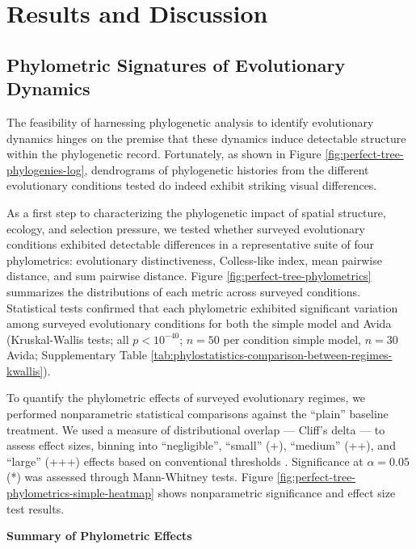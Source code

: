 \section{Results and Discussion}
\label{sec:results}

\subsection{Phylometric Signatures of Evolutionary Dynamics}




The feasibility of harnessing phylogenetic analysis to identify evolutionary dynamics hinges on the premise that these dynamics induce detectable structure within the phylogenetic record.
Fortunately, as shown in Figure \ref{fig:perfect-tree-phylogenies-log}, dendrograms of phylogenetic histories from the different evolutionary conditions tested do indeed exhibit striking visual differences.

As a first step to characterizing the phylogenetic impact of spatial structure, ecology, and selection pressure, we tested whether surveyed evolutionary conditions exhibited detectable differences in a representative suite of four phylometrics: evolutionary distinctiveness, Colless-like index, mean pairwise distance, and sum pairwise distance.
Figure \ref{fig:perfect-tree-phylometrics} summarizes the distributions of each metric across surveyed conditions.
Statistical tests confirmed that each phylometric exhibited significant variation among surveyed evolutionary conditions for both the simple model and Avida (Kruskal-Wallis tests; all $p < 10^{-40}$; $n=50$ per condition simple model, $n=30$ Avida; Supplementary Table \ref{tab:phylostatistics-comparison-between-regimes-kwallis}).

To quantify the phylometric effects of surveyed evolutionary regimes, we performed nonparametric statistical comparisons against the ``plain'' baseline treatment.
We used a measure of distributional overlap --- Cliff's delta --- to assess effect sizes, binning into ``negligible'', ``small'' (+), ``medium'' (++), and ``large'' (+++) effects based on conventional thresholds \citep{hess2004robust}.
Significance at $\alpha = 0.05$ (*) was assessed through Mann-Whitney tests.
Figure \ref{fig:perfect-tree-phylometrics-simple-heatmap} shows nonparametric significance and effect size test results.

\noindent
\textbf{Summary of Phylometric Effects}

